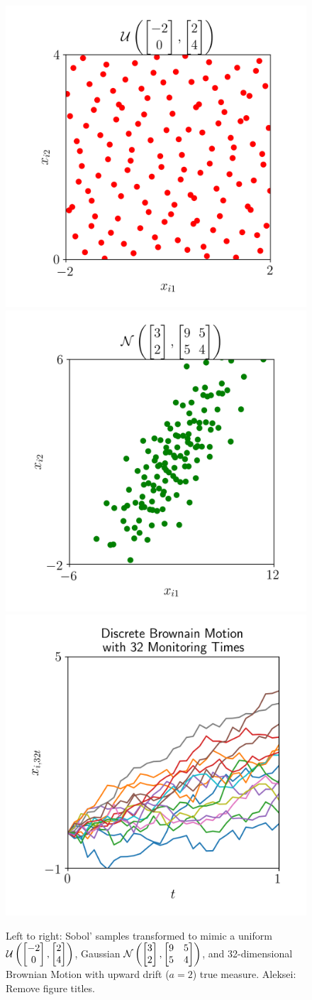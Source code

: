 \documentclass[graybox,footinfo]{svmult}
\newcommand{\AGSComment}[1]{{\color{cyan} Aleksei: #1}}
\begin{document}


\begin{figure}
	\includegraphics[width=.3\textwidth]{ags/figs/tm.uniform.png} 
	\includegraphics[width=.3\textwidth]{ags/figs/tm.gaussian.png}
	\includegraphics[width=.3\textwidth]{ags/figs/tm.brownian_motion.png}
	\caption{Left to right: Sobol' samples transformed to mimic a uniform ${\mathcal{U}}\left(\begin{bmatrix} -2 \\ 0 \end{bmatrix}, \begin{bmatrix} 2 \\ 4 \end{bmatrix} \right)$, Gaussian ${\mathcal{N}}\left(\begin{bmatrix} 3 \\ 2 \end{bmatrix}, \begin{bmatrix} 9 & 5 \\ 5 & 4 \end{bmatrix} \right)$, and 32-dimensional Brownian Motion with upward drift ($a=2$) true measure. \AGSComment{Remove figure titles.}}
	\label{fig:tm}
\end{figure}
\end{document}
